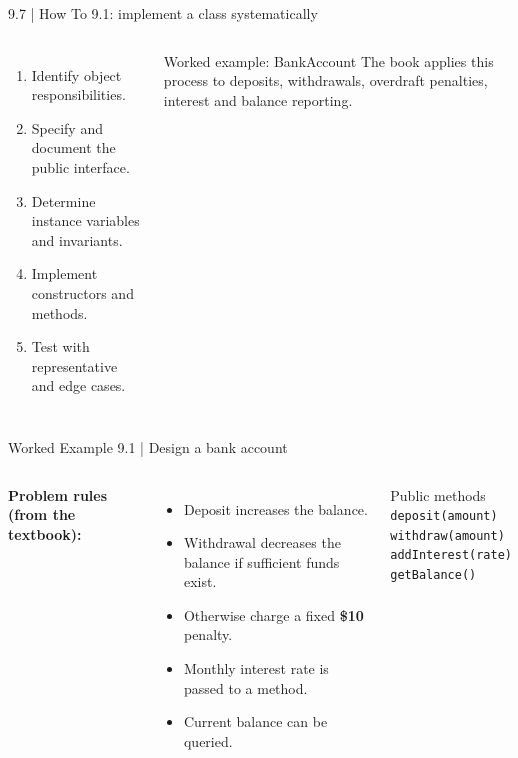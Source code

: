 \documentclass[10pt,aspectratio=169]{beamer}
\begin{document}
\begin{frame}{9.7 | How To 9.1: implement a class systematically}
\begin{columns}[T,onlytextwidth]
\begin{enumerate}\setlength{\itemsep}{6pt}
\item Identify object responsibilities.
\item Specify and document the public interface.
\item Determine instance variables and invariants.
\item Implement constructors and methods.
\item Test with representative and edge cases.
\end{enumerate}
\begin{exampleblock}{Worked example: BankAccount}
The book applies this process to deposits, withdrawals, overdraft penalties, interest and balance reporting.
\end{exampleblock}
\end{columns}
\end{frame}

\begin{frame}{Worked Example 9.1 | Design a bank account}
\begin{columns}[T,onlytextwidth]
\textbf{Problem rules (from the textbook):}
\begin{itemize}\setlength{\itemsep}{5pt}
\item Deposit increases the balance.
\item Withdrawal decreases the balance if sufficient funds exist.
\item Otherwise charge a fixed \textbf{\$10} penalty.
\item Monthly interest rate is passed to a method.
\item Current balance can be queried.
\end{itemize}
\begin{block}{Public methods}
\texttt{deposit(amount)}\\
\texttt{withdraw(amount)}\\
\texttt{addInterest(rate)}\\
\texttt{getBalance()}
\end{block}
\end{columns}
\end{frame}
\end{document}
